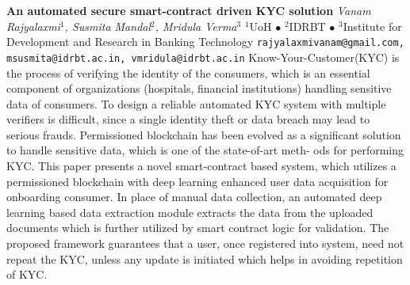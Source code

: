 
    \begin{conf-abstract}[]
        {\textbf{An automated secure smart-contract driven KYC solution}}
        {\textit{Vanam  Rajyalaxmi$^{1}$, Susmita Mandal$^{2}$, Mridula Verma$^{3}$}}
        {$^{1}$UoH $\bullet$ $^{2}$IDRBT $\bullet$ $^{3}$Institute for Development and Research in Banking Technology}
        {\texttt{rajyalaxmivanam@gmail.com, msusmita@idrbt.ac.in, vmridula@idrbt.ac.in}}
        {Know-Your-Customer(KYC) is the process of verifying the identity of the consumers, which is an essential component of organizations (hospitals, financial institutions) handling sensitive data of consumers. To design a reliable automated KYC system with multiple verifiers is difficult, since a single identity theft or data breach may lead to serious frauds. Permissioned blockchain has been evolved as a significant solution to handle sensitive data, which is one of the state-of-art meth- ods for performing KYC. This paper presents a novel smart-contract based system, which utilizes a permissioned blockchain with deep learning enhanced user data acquisition for onboarding consumer. In place of manual data collection, an automated deep learning based data extraction module extracts the data from the uploaded documents which is further utilized by smart contract logic for validation. The proposed framework guarantees that a user, once registered into system, need not repeat the KYC, unless any update is initiated which helps in avoiding repetition of KYC.}
    \end{conf-abstract}
        